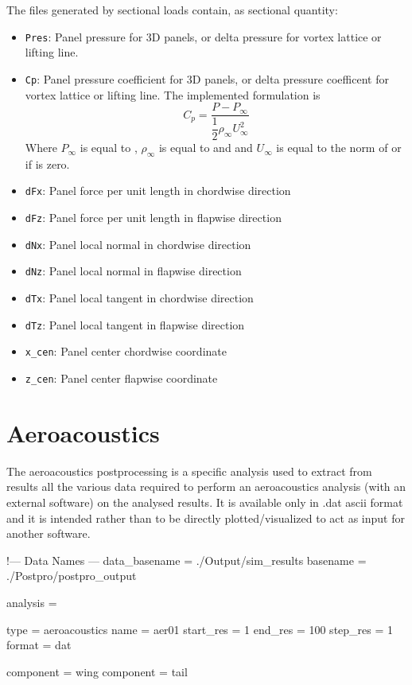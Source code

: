 The files generated by sectional loads contain, as sectional quantity:
\begin{itemize}
  \item \texttt{Pres}: Panel pressure for 3D panels, or delta pressure for vortex lattice or 
                      lifting  line. 
  \item \texttt{Cp}: Panel pressure coefficient for 3D panels, or delta pressure 
                    coefficent for vortex lattice or lifting line. The implemented formulation is 
                    \begin{equation}
                      C_p = \dfrac{P - P_\infty}{\dfrac{1}{2} \rho_\infty U_\infty^2}
                    \end{equation}
                    Where $P_\infty$ is equal to , $\rho_\infty$ is equal to  and 
                    and $U_\infty$ is equal to the norm of  or  if  is zero. 
  \item \texttt{dFx}: Panel force per unit length in chordwise direction
  \item \texttt{dFz}: Panel force per unit length in flapwise direction
  \item \texttt{dNx}: Panel local normal in chordwise direction
  \item \texttt{dNz}: Panel local normal in flapwise direction
  \item \texttt{dTx}: Panel local tangent in chordwise direction
  \item \texttt{dTz}: Panel local tangent in flapwise direction
  \item \texttt{x\_cen}: Panel center chordwise coordinate
  \item \texttt{z\_cen}: Panel center flapwise coordinate
\end{itemize}


\section{Aeroacoustics}
The aeroacoustics postprocessing is a specific analysis used to 
extract from results all the various data required to perform an 
aeroacoustics analysis (with an external software) on the analysed results. 
It is available only in .dat ascii format  and it is intended rather than 
to be directly plotted/visualized to act as input for another software.

\begin{inputfile}[frame=single, caption={dust\_post.in for aeroacoustics}, 
  label={file:dust_post.in_aeroacoustics}]
!--- Data Names ---
data_basename = ./Output/sim_results
basename =     ./Postpro/postpro_output

analysis = {

type = aeroacoustics
name = aer01
start_res = 1
end_res   = 100 
step_res  = 1
format = dat

component = wing
component = tail

}
\end{inputfile}

